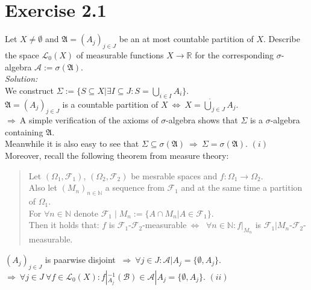 \documentclass{article}
\begin{document}
\section*{Exercise 2.1}
Let $X \neq \emptyset$ and $\mathfrak{A} = (A_j)_{j\in J}$ be an at most countable partition of $X$. Describe the space $\mathcal{L}_0(X)$ of measurable functions $X \rightarrow \mathbb{R}$ for the corresponding $\sigma$-algebra $\mathcal{A}:=\sigma (\mathfrak{A})$. \\
\textit{Solution: }\\
We construct $\Sigma:=\{ S \subseteq X | \exists I\subseteq J : S = \bigcup_{i\in I} A_i\} $.\\ 
$\mathfrak{A} = (A_j)_{j\in J}$ is a countable partition of $X \ \Leftrightarrow \ X = \dot{\bigcup}_{j \in J} A_j$.\\
$\Rightarrow \ $A simple verification of the axioms of $\sigma$-algebra shows that $\Sigma$ is a $\sigma$-algebra containing $\mathfrak{A}$. \\
Meanwhile it is also easy to see that $\Sigma \subseteq \sigma(\mathfrak{A}) \ \Rightarrow \ \Sigma = \sigma(\mathfrak{A}) $.\hspace{5cm} $(i)$ \\
Moreover, recall the following theorem from measure theory: \\ \vspace*{-2.5em}
\begin{quote}
Let $(\Omega_1, \mathcal{F}_1)$, $(\Omega_2, \mathcal{F}_2)$ be mesrable spaces and  $f:\Omega_1 \rightarrow \Omega_2$.\\
Also let $(M_n)_{n\in \mathbb{N}}$ a sequence from $\mathcal{F}_1$ and at the same time a partition of $\Omega_1$. \\
For $\forall n\in \mathbb{N} $ denote $\mathcal{F}_1 \; | \; M_n := \{ A\cap M_n | A\in \mathcal{F}_1 \}$. \\
Then it holds that: $f$ is $\mathcal{F}_1$-$\mathcal{F}_2$-measurable$\ \Leftrightarrow \ $ $\forall n \in \mathbb{N}: f|_{M_n}$ is $\mathcal{F}_1 |M_n$-$\mathcal{F}_2$-measurable.\\
\end{quote} \vspace*{-2.5em}
$(A_j)_{j\in J}$ is paarwise disjoint $\ \Rightarrow \  \forall j\in J: \mathcal{A}|A_j = \{ \emptyset, A_j \}$.\\
$\Rightarrow \ \forall j \in J\  \forall f \in \mathcal{L}_0(X):  f|_{A_j}^{-1}(\mathcal{B}) \in \mathcal{A}|A_j = \{ \emptyset, A_j \}  $. \hspace{6.5cm} $(ii)$\\
\end{document}
